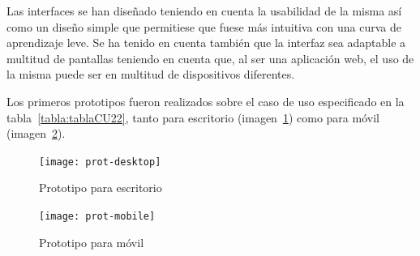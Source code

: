 Las interfaces se han diseñado teniendo en cuenta la usabilidad de la misma así como un diseño simple que permitiese que fuese más intuitiva con una curva de aprendizaje leve. Se ha tenido en cuenta también que la interfaz sea adaptable a multitud de pantallas teniendo en cuenta que, al ser una aplicación web, el uso de la misma puede ser en multitud de dispositivos diferentes.


Los primeros prototipos fueron realizados sobre el caso de uso especificado en la tabla~\ref{tabla:tablaCU22}, tanto para escritorio (imagen~\ref{fig:proto-desk}) como para móvil (imagen~\ref{fig:proto-mob}).

\begin{figure}[h]
	\centering
	\texttt{[image: prot-desktop]}
	\caption{Prototipo para escritorio}
	\label{fig:proto-desk}
\end{figure}

\begin{figure}[h]
	\centering
	\texttt{[image: prot-mobile]}
	\caption{Prototipo para móvil}
	\label{fig:proto-mob}
\end{figure}
